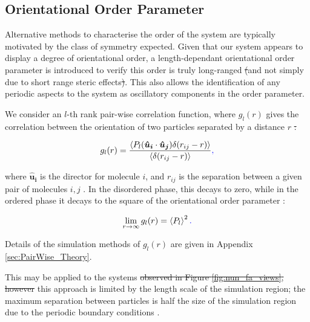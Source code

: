 \documentclass[11pt, a4paper]{article} %
\providecommand{\DIFadd}[1]{{\protect\color{blue}\uwave{#1}}} %
\providecommand{\DIFdel}[1]{{\protect\color{red}\sout{#1}}}                      %
\providecommand{\DIFaddbegin}{} %
\providecommand{\DIFaddend}{} %
\providecommand{\DIFdelbegin}{} %
\providecommand{\DIFdelend}{} %
\begin{document}
\subsection{Orientational Order Parameter} \label{sec:PairWise_Application}
Alternative methods to characterise the order of the system are typically motivated by the class of symmetry expected. Given that our system appears to display a degree of orientational order, a length-dependant orientational order parameter is introduced to verify this order is truly long-ranged \DIFdelbegin \DIFdel{(}\DIFdelend and not simply due to short range steric effects\DIFdelbegin \DIFdel{)}\DIFdelend . This also allows the identification of any periodic aspects to the system as oscillatory components in the order parameter.

We consider an $l$-th rank pair-wise correlation function, where $g_{l}(r)$ gives the correlation between the orientation of two particles separated by a distance $r$
\DIFdelbegin \DIFdel{:
}\DIFdelend 

\begin{equation} \label{eq:PairWise_eq}
g_{l}(r) = \frac{\langle P_{l}(\boldsymbol{\hat{u}_{i}}\cdot \boldsymbol{\hat{u}_{j}}) \delta(r_{ij}-r)\rangle}{\langle  \delta(r_{ij}-r) \rangle}\DIFaddbegin \DIFadd{,
}\DIFaddend \end{equation}

where $\boldsymbol{\hat{u}_{i}}$ is the director for molecule $i$, and $r_{ij}$ is the separation between a given pair of molecules \DIFdelbegin \DIFdel{$i,j$ }\DIFdelend \DIFaddbegin \DIFadd{$i$ and $j$ }\DIFaddend \cite{Zannoni1979}. In the disordered phase, this \DIFaddbegin \DIFadd{\textcolor{forestgreen}{pair-correlation function} }\DIFaddend decays to zero, while in the ordered phase it decays to the square of the orientational order parameter \cite{Frenkel1985b}:

\begin{equation}
\lim_{r \to \infty}g_{l}(r) = \left\langle P_{l} \right\rangle ^{2}\DIFaddbegin \DIFadd{.
}\DIFaddend \end{equation}

Details of the simulation methods of $g_{l}(r)$ are given in Appendix \ref{sec:PairWise_Theory}. 

This may be applied to the systems \DIFdelbegin \DIFdel{observed in Figure \ref{fig:nun_fa_views}, however }\DIFdelend \DIFaddbegin \DIFadd{\textcolor{forestgreen}{shown in Figure \ref{fig:nun_fa_views}. However,} }\DIFaddend this approach is limited by the length scale of the simulation region; the maximum separation between particles is half the size of the simulation region due to the periodic boundary conditions \cite{Frenkel1985c}.
\end{document}
